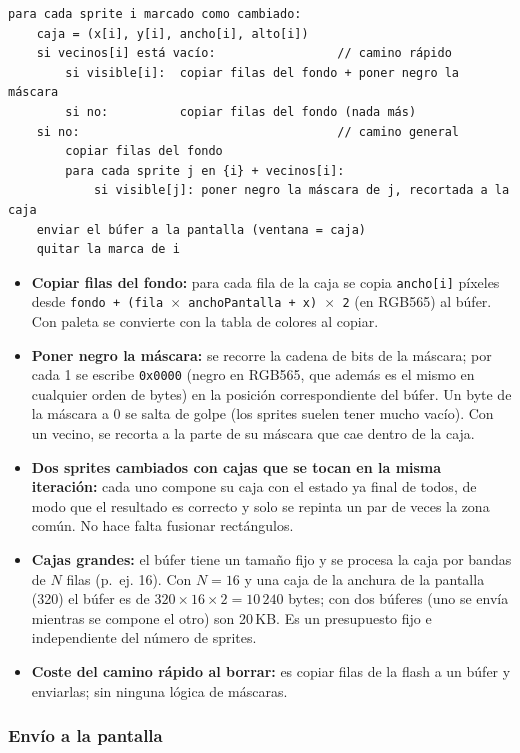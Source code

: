 \begin{verbatim}
para cada sprite i marcado como cambiado:
    caja = (x[i], y[i], ancho[i], alto[i])
    si vecinos[i] está vacío:                 // camino rápido
        si visible[i]:  copiar filas del fondo + poner negro la máscara
        si no:          copiar filas del fondo (nada más)
    si no:                                    // camino general
        copiar filas del fondo
        para cada sprite j en {i} + vecinos[i]:
            si visible[j]: poner negro la máscara de j, recortada a la caja
    enviar el búfer a la pantalla (ventana = caja)
    quitar la marca de i
\end{verbatim}

\begin{itemize}
	\item \textbf{Copiar filas del fondo:} para cada fila de la caja se copia \texttt{ancho[i]} píxeles desde \texttt{fondo + (fila\,$\times$\,anchoPantalla + x)\,$\times$\,2} (en RGB565) al búfer. Con paleta se convierte con la tabla de colores al copiar.
	\item \textbf{Poner negro la máscara:} se recorre la cadena de bits de la máscara; por cada 1 se escribe \texttt{0x0000} (negro en RGB565, que además es el mismo en cualquier orden de bytes) en la posición correspondiente del búfer. Un byte de la máscara a 0 se salta de golpe (los sprites suelen tener mucho vacío). Con un vecino, se recorta a la parte de su máscara que cae dentro de la caja.
	\item \textbf{Dos sprites cambiados con cajas que se tocan en la misma iteración:} cada uno compone su caja con el estado ya final de todos, de modo que el resultado es correcto y solo se repinta un par de veces la zona común. No hace falta fusionar rectángulos.
	\item \textbf{Cajas grandes:} el búfer tiene un tamaño fijo y se procesa la caja por bandas de $N$ filas (p.~ej. 16). Con $N=16$ y una caja de la anchura de la pantalla (320) el búfer es de $320\times16\times2=10\,240$ bytes; con dos búferes (uno se envía mientras se compone el otro) son 20\,KB. Es un presupuesto fijo e independiente del número de sprites.
	\item \textbf{Coste del camino rápido al borrar:} es copiar filas de la flash a un búfer y enviarlas; sin ninguna lógica de máscaras.
\end{itemize}

\subsubsection{Envío a la pantalla}

